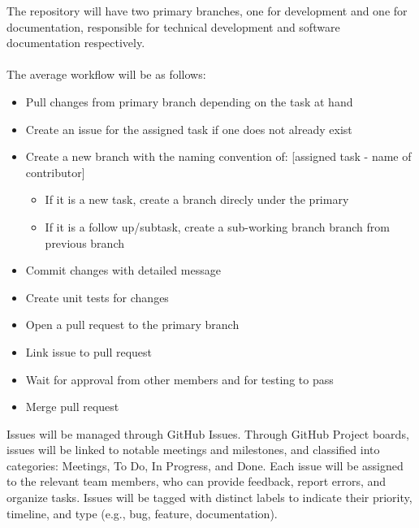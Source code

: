 \documentclass{article}
\begin{document}
The repository will have two primary branches, one for development and one for documentation, responsible for technical development and software documentation respectively.
\\\\
The average workflow will be as follows: \\
\begin{itemize}
  \item Pull changes from primary branch depending on the task at hand
  \item Create an issue for the assigned task if one does not already exist
  \item Create a new branch with the naming convention of: [assigned task - name of contributor]
  \begin{itemize}
    \item If it is a new task, create a branch direcly under the primary
    \item If it is a follow up/subtask, create a sub-working branch branch from previous branch
  \end{itemize}
  \item Commit changes with detailed message
  \item Create unit tests for changes
  \item Open a pull request to the primary branch
  \item Link issue to pull request
  \item Wait for approval from other members and for testing to pass
  \item Merge pull request
\end{itemize}

Issues will be managed through GitHub Issues. Through GitHub Project boards, issues will be linked to notable meetings and milestones, and classified into categories: Meetings, To Do, In Progress, and Done. Each issue will be assigned to the relevant team members, who can provide feedback, report errors, and organize tasks. Issues will be tagged with distinct labels to indicate their priority, timeline, and type (e.g., bug, feature, documentation).
\\
\end{document}
